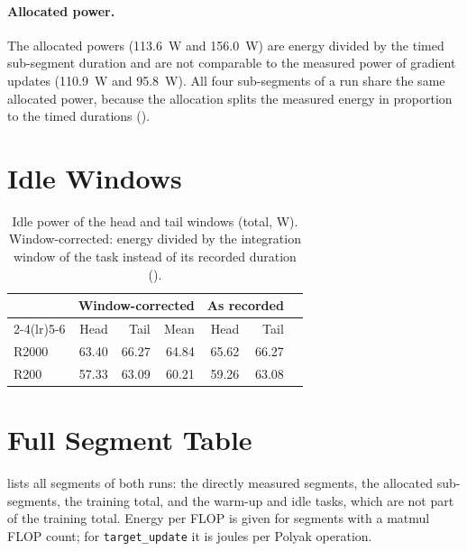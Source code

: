 \paragraph{Allocated power.}
The allocated powers (\SI{113.6}{\watt} and \SI{156.0}{\watt}) are energy divided by the timed sub-segment duration and are not comparable to the measured power of gradient updates (\SI{110.9}{\watt} and \SI{95.8}{\watt}).
All four sub-segments of a run share the same allocated power, because the allocation splits the measured energy in proportion to the timed durations ().

\section{Idle Windows}
\label{app:clock-idle}

\begin{table}[tbp]
  \centering
  \caption{Idle power of the head and tail windows (total, W). Window-corrected: energy divided by the integration window of the task instead of its recorded duration ().}
  \label{tab:app-clock-idle}
  \begin{tabular}{lrrrrrr}
    \toprule
          & \multicolumn{3}{c}{Window-corrected} & \multicolumn{2}{c}{As recorded} &                  \\
    \cmidrule(lr){2-4}\cmidrule(lr){5-6}
          & Head                                 & Tail                            & Mean            & Head  & Tail \\
    \midrule
    R2000 & 63.40 & 66.27 & 64.84 & 65.62 & 66.27 \\
    R200 & 57.33 & 63.09 & 60.21 & 59.26 & 63.08 \\
    \bottomrule
  \end{tabular}
\end{table}

\section{Full Segment Table}
\label{app:clock-full}

 lists all segments of both runs: the directly measured segments, the allocated sub-segments, the training total, and the warm-up and idle tasks, which are not part of the training total.
Energy per FLOP is given for segments with a matmul FLOP count; for \texttt{target\_\allowbreak update} it is joules per Polyak operation.

